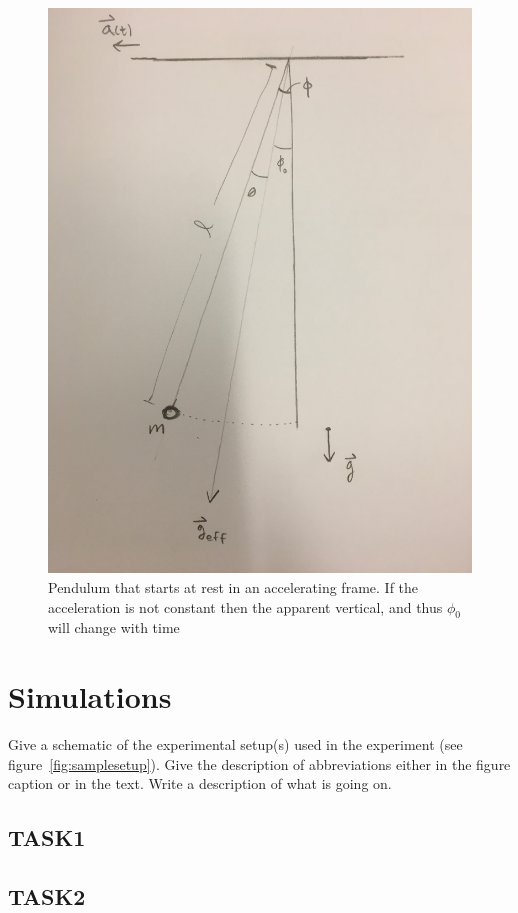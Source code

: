\documentclass[letterpaper,12pt]{article}
\begin{document}
\begin{figure}[!h]
    \centering
    \includegraphics[width=.8\textwidth]{pendulum.jpg}
    \caption{Pendulum that starts at rest in an accelerating frame. If the acceleration is not constant then the apparent vertical, and thus $\phi_0$ will change with time}
\end{figure}

\section{Simulations}

Give a schematic of the experimental setup(s) used in the experiment (see
figure~\ref{fig:samplesetup}). Give the description of  abbreviations
either in the figure caption or in the text. Write a description of what is
going on. 

\subsection{TASK1}

\subsection{TASK2}
\end{document}
